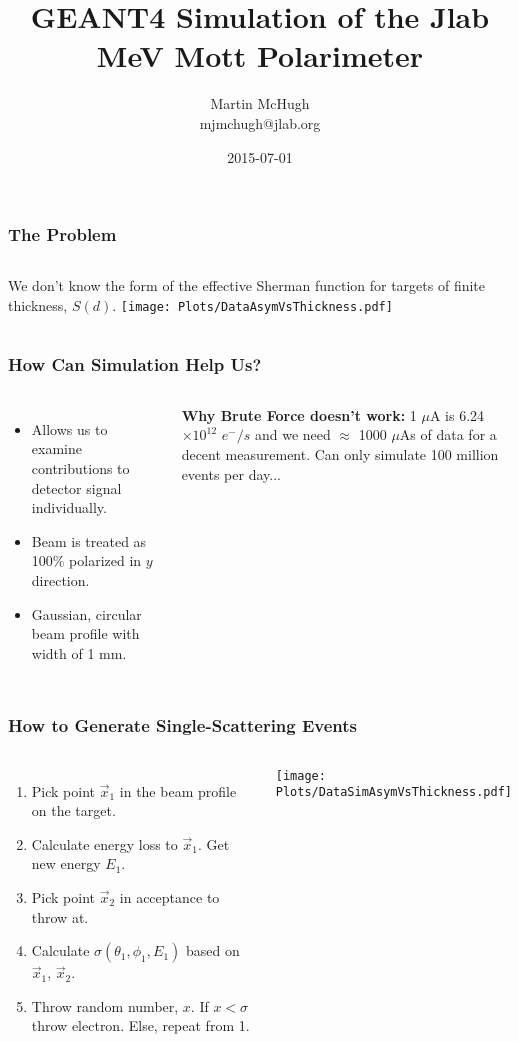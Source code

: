 \documentclass{beamer}
\title{\textbf{GEANT4 Simulation of the Jlab MeV Mott Polarimeter}}
\author{Martin McHugh\\
		 mjmchugh@jlab.org}
\date{2015-07-01}
\begin{document}
\begin{frame}
\maketitle
\end{frame}

\begin{frame}
\frametitle{The Problem}
\begin{columns}[c] %
We don't know the form of the effective Sherman function for targets of finite thickness, $S(d)$.
\texttt{[image: Plots/DataAsymVsThickness.pdf]}
\end{columns} 
\end{frame}

\begin{frame}
 \frametitle{How Can Simulation Help Us?}
 \begin{columns}[c] %
  \begin{itemize}
   \item Allows us to examine contributions to detector signal individually.
   \item Beam is treated as 100\% polarized in $y$ direction.
   \item Gaussian, circular beam profile with width of 1 mm.
  \end{itemize}
  \textbf{Why Brute Force doesn't work:} 1 $\mu$A is 6.24$\times 10^{12}$ $e^{-}/s$ and we need $\approx$ 1000 $\mu$As of data for a decent measurement. Can only simulate 100 million events per day...
 \end{columns}
\end{frame}

\begin{frame}
 \frametitle{How to Generate Single-Scattering Events}
 \begin{columns}[c] %
   \begin{enumerate}
    \item Pick point $\vec{x}_1$ in the beam profile on the target.
    \item Calculate energy loss to $\vec{x}_1$. Get new energy $E_1$.
    \item Pick point $\vec{x}_2$ in acceptance to throw at.
    \item Calculate $\sigma(\theta_1,\phi_1, E_1)$ based on $\vec{x}_1$, $\vec{x}_2$.
    \item Throw random number, $x$. If $ x < \sigma $ throw electron. Else, repeat from 1.
   \end{enumerate}
   \texttt{[image: Plots/DataSimAsymVsThickness.pdf]}
 \end{columns}
\end{frame}
\end{document}
